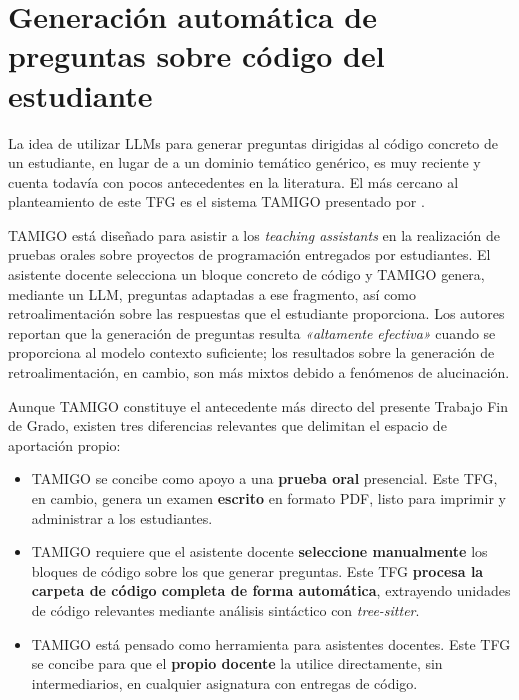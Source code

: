 \section{Generación automática de preguntas sobre código del estudiante}
\label{sec:viva-llm}

La idea de utilizar LLMs para generar preguntas dirigidas al código
concreto de un estudiante, en lugar de a un dominio temático genérico,
es muy reciente y cuenta todavía con pocos antecedentes en la
literatura. El más cercano al planteamiento de este TFG es el sistema
TAMIGO presentado por \textcite{anishka2024tamigo}.

TAMIGO está diseñado para asistir a los \emph{teaching assistants} en
la realización de pruebas orales sobre proyectos de
programación entregados por estudiantes. El asistente docente selecciona
un bloque concreto de código y TAMIGO genera, mediante un LLM,
preguntas adaptadas a ese fragmento, así como retroalimentación sobre
las respuestas que el estudiante proporciona. Los autores reportan que
la generación de preguntas resulta \emph{«altamente efectiva»} cuando se
proporciona al modelo contexto suficiente; los resultados sobre la
generación de retroalimentación, en cambio, son más mixtos debido a
fenómenos de alucinación.

Aunque TAMIGO constituye el antecedente más directo del presente
Trabajo Fin de Grado, existen tres diferencias relevantes que delimitan
el espacio de aportación propio:

\begin{itemize}
  \item TAMIGO se concibe como apoyo a una \textbf{prueba oral}
        presencial. Este TFG, en cambio, genera un examen
        \textbf{escrito} en formato PDF, listo para imprimir y
        administrar a los estudiantes.
  \item TAMIGO requiere que el asistente docente \textbf{seleccione
        manualmente} los bloques de código sobre los que generar
        preguntas. Este TFG \textbf{procesa la carpeta de código
        completa de forma automática}, extrayendo unidades de código
        relevantes mediante análisis sintáctico con \emph{tree-sitter}.
  \item TAMIGO está pensado como herramienta para asistentes docentes.
        Este TFG se concibe para que el
        \textbf{propio docente} la utilice directamente, sin
        intermediarios, en cualquier asignatura con entregas de código.
\end{itemize}

